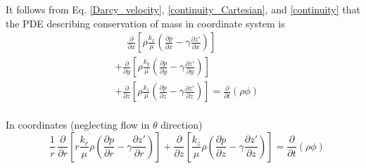 \documentclass{llncs}
\numberwithin{equation}{section}
\numberwithin{figure}{section}
\numberwithin{table}{section}
\begin{document}
    It follows from Eq. \ref{Darcy_velocity}, \ref{continuity_Cartesian}, and \ref{continuity} that the PDE describing conservation of mass in  coordinate system is
    \begin{equation}
        \begin{split}
            & \,\,\,\,\,\,\ \frac{\partial }{\partial x}\left[ \rho \frac{{{k}_{x}}}{\mu }\left( \frac{\partial p}{\partial x}-\gamma \frac{\partial z'}{\partial x} \right) \right] \\
            & +\frac{\partial }{\partial y}\left[ \rho \frac{{{k}_{y}}}{\mu }\left( \frac{\partial p}{\partial y}-\gamma \frac{\partial z'}{\partial y} \right) \right] \\
            & +\frac{\partial }{\partial z}\left[ \rho \frac{{{k}_{z}}}{\mu }\left( \frac{\partial p}{\partial z}-\gamma \frac{\partial z'}{\partial z} \right) \right]=\frac{\partial }{\partial t}\left( \rho \phi  \right) \\
        \end{split}
    \label{Continuity_Darcy}
    \end{equation}

    In  coordinates (neglecting flow in $\theta$ direction)
    \begin{equation}
        \,\,\,\,\,\frac{1}{r}\,\frac{\partial }{\partial r}\left[ r\frac{{{k}_{r}}}{\mu }\rho \left( \frac{\partial p}{\partial r}-\gamma \frac{\partial z'}{\partial r} \right) \right]+\frac{\partial }{\partial z}\left[ \frac{{{k}_{z}}}{\mu }\rho \left( \frac{\partial p}{\partial z}-\gamma \frac{\partial z'}{\partial z} \right) \right]=\frac{\partial }{\partial t}\left( \rho \phi  \right)
    \label{Continuity_Darcy_Cylindrical}
    \end{equation}
    
\end{document}
